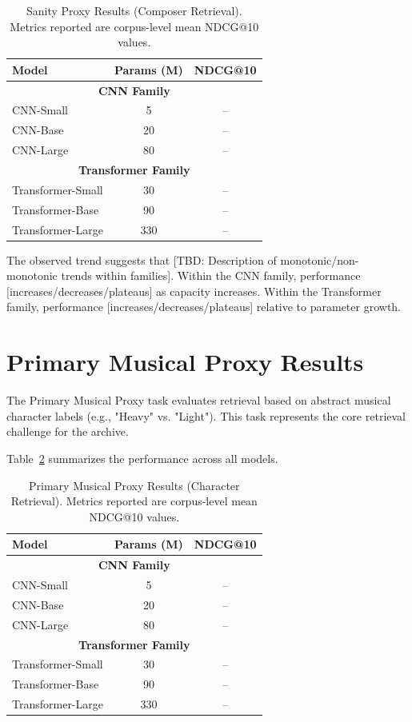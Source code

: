 \begin{table}[h]
\centering
\caption{Sanity Proxy Results (Composer Retrieval). Metrics reported are corpus-level mean NDCG@10 values.}
\label{tab:sanity_results}
\begin{tabular}{lcc}
\hline
\textbf{Model} & \textbf{Params (M)} & \textbf{NDCG@10} \\
\hline
\multicolumn{3}{c}{\textbf{CNN Family}} \\
CNN-Small & 5 & -- \\
CNN-Base  & 20 & -- \\
CNN-Large & 80 & -- \\
\hline
\multicolumn{3}{c}{\textbf{Transformer Family}} \\
Transformer-Small & 30 & -- \\
Transformer-Base  & 90 & -- \\
Transformer-Large & 330 & -- \\
\hline
\end{tabular}
\end{table}

The observed trend suggests that [TBD: Description of monotonic/non-monotonic trends within families]. Within the CNN family, performance [increases/decreases/plateaus] as capacity increases. Within the Transformer family, performance [increases/decreases/plateaus] relative to parameter growth.

\section{Primary Musical Proxy Results}

The Primary Musical Proxy task evaluates retrieval based on abstract musical character labels (e.g., "Heavy" vs. "Light"). This task represents the core retrieval challenge for the archive.

Table~\ref{tab:musical_results} summarizes the performance across all models.

\begin{table}[h]
\centering
\caption{Primary Musical Proxy Results (Character Retrieval). Metrics reported are corpus-level mean NDCG@10 values.}
\label{tab:musical_results}
\begin{tabular}{lcc}
\hline
\textbf{Model} & \textbf{Params (M)} & \textbf{NDCG@10} \\
\hline
\multicolumn{3}{c}{\textbf{CNN Family}} \\
CNN-Small & 5 & -- \\
CNN-Base  & 20 & -- \\
CNN-Large & 80 & -- \\
\hline
\multicolumn{3}{c}{\textbf{Transformer Family}} \\
Transformer-Small & 30 & -- \\
Transformer-Base  & 90 & -- \\
Transformer-Large & 330 & -- \\
\hline
\end{tabular}
\end{table}

